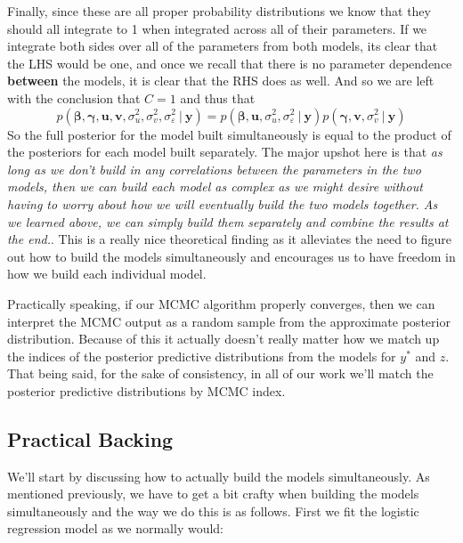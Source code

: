 \documentclass[12pt,twoside]{reedthesis}
\begin{document}
Finally, since these are all proper probability distributions we know that they should all integrate to 1 when integrated across all of their parameters. If we integrate both sides over all of the parameters from both models, its clear that the LHS would be one, and once we recall that there is no parameter dependence \textbf{between} the models, it is clear that the RHS does as well. And so we are left with the conclusion that \(C = 1\) and thus that
\begin{equation}
p(\boldsymbol{\beta}, \boldsymbol{\gamma}, \mathbf{u}, \mathbf{v}, \sigma_u^2, \sigma_v^2, \sigma_{\varepsilon}^2\ | \ \mathbf{y})  = p(\boldsymbol{\beta}, \mathbf{u}, \sigma_u^2, \sigma_{\varepsilon}^2 \ | \ \mathbf{y})p(\boldsymbol{\gamma}, \mathbf{v}, \sigma_v^2 \ | \ \mathbf{y})
\label{eq:sepsimeq}
\end{equation}
So the full posterior for the model built simultaneously is equal to the product of the posteriors for each model built separately. The major upshot here is that \emph{as long as we don't build in any correlations between the parameters in the two models, then we can build each model as complex as we might desire without having to worry about how we will eventually build the two models together. As we learned above, we can simply build them separately and combine the results at the end.}. This is a really nice theoretical finding as it alleviates the need to figure out how to build the models simultaneously and encourages us to have freedom in how we build each individual model.

Practically speaking, if our MCMC algorithm properly converges, then we can interpret the MCMC output as a random sample from the approximate posterior distribution. Because of this it actually doesn't really matter how we match up the indices of the posterior predictive distributions from the models for \(y^*\) and \(z\). That being said, for the sake of consistency, in all of our work we'll match the posterior predictive distributions by MCMC index.

\hypertarget{practical-backing}{%
\subsection{Practical Backing}\label{practical-backing}}

We'll start by discussing how to actually build the models simultaneously. As mentioned previously, we have to get a bit crafty when building the models simultaneously and the way we do this is as follows. First we fit the logistic regression model as we normally would:
\end{document}
